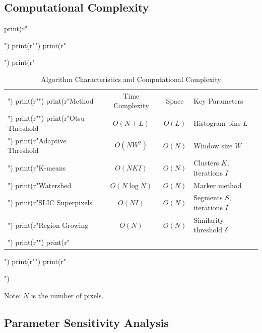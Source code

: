 \documentclass[a4paper, 11pt]{article}
\begin{document}
\subsection{Computational Complexity}

\begin{pycode}
print(r"\begin{table}[htbp]")
print(r"\centering")
print(r"\caption{Algorithm Characteristics and Computational Complexity}")
print(r"\begin{tabular}{lccl}")
print(r"\toprule")
print(r"Method & Time Complexity & Space & Key Parameters \\")
print(r"\midrule")
print(r"Otsu Threshold & $O(N + L)$ & $O(L)$ & Histogram bins $L$ \\")
print(r"Adaptive Threshold & $O(NW^2)$ & $O(N)$ & Window size $W$ \\")
print(r"K-means & $O(NKI)$ & $O(N)$ & Clusters $K$, iterations $I$ \\")
print(r"Watershed & $O(N \log N)$ & $O(N)$ & Marker method \\")
print(r"SLIC Superpixels & $O(NI)$ & $O(N)$ & Segments $S$, iterations $I$ \\")
print(r"Region Growing & $O(N)$ & $O(N)$ & Similarity threshold $\delta$ \\")
print(r"\bottomrule")
print(r"\end{tabular}")
print(r"\label{tab:complexity}")
print(r"\end{table}")
\end{pycode}

Note: $N$ is the number of pixels.

\subsection{Parameter Sensitivity Analysis}
\end{document}
